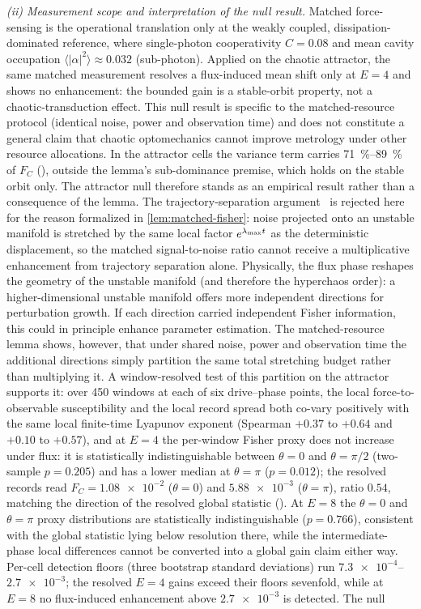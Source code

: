 \documentclass[preprint,numbers,a4paper]{elsarticle}
\begin{document}
\emph{(ii) Measurement scope and interpretation of the null result.} Matched force-sensing is the operational translation only at the weakly coupled, dissipation-dominated reference, where single-photon cooperativity $C=\num{0.08}$ and mean cavity occupation $\langle|\alpha|^2\rangle\approx\num{0.032}$ (sub-photon). Applied on the chaotic attractor, the same matched measurement resolves a flux-induced mean shift only at $E=\num{4}$ and shows no enhancement: the bounded gain is a stable-orbit property, not a chaotic-transduction effect. This null result is specific to the matched-resource protocol (identical noise, power and observation time) and does not constitute a general claim that chaotic optomechanics cannot improve metrology under other resource allocations. In the attractor cells the variance term carries \qty{71}{\percent}--\qty{89}{\percent} of $F_C$ (), outside the lemma's sub-dominance premise, which holds on the stable orbit only. The attractor null therefore stands as an empirical result rather than a consequence of the lemma. The trajectory-separation argument~\cite{Xu2025,muthukumar2025doi} is rejected here for the reason formalized in \cref{lem:matched-fisher}: noise projected onto an unstable manifold is stretched by the same local factor $e^{\lambda_{\rm max}t}$ as the deterministic displacement, so the matched signal-to-noise ratio cannot receive a multiplicative enhancement from trajectory separation alone. Physically, the flux phase reshapes the geometry of the unstable manifold (and therefore the hyperchaos order): a higher-dimensional unstable manifold offers more independent directions for perturbation growth. If each direction carried independent Fisher information, this could in principle enhance parameter estimation. The matched-resource lemma shows, however, that under shared noise, power and observation time the additional directions simply partition the same total stretching budget rather than multiplying it. A window-resolved test of this partition on the attractor supports it: over \num{450} windows at each of six drive--phase points, the local force-to-observable susceptibility and the local record spread both co-vary positively with the same local finite-time Lyapunov exponent (Spearman $+0.37$ to $+0.64$ and $+0.10$ to $+0.57$), and at $E=\num{4}$ the per-window Fisher proxy does not increase under flux: it is statistically indistinguishable between $\theta=0$ and $\theta=\pi/2$ (two-sample $p=\num{0.205}$) and has a lower median at $\theta=\pi$ ($p=\num{0.012}$); the resolved records read $F_C=\num{1.08e-2}$ ($\theta=0$) and $\num{5.88e-3}$ ($\theta=\pi$), ratio $\num{0.54}$, matching the direction of the resolved global statistic (). At $E=\num{8}$ the $\theta=0$ and $\theta=\pi$ proxy distributions are statistically indistinguishable ($p=\num{0.766}$), consistent with the global statistic lying below resolution there, while the intermediate-phase local differences cannot be converted into a global gain claim either way. Per-cell detection floors (three bootstrap standard deviations) run $\num{7.3e-4}$--$\num{2.7e-3}$; the resolved $E=\num{4}$ gains exceed their floors sevenfold, while at $E=\num{8}$ no flux-induced enhancement above $\num{2.7e-3}$ is detected. The null 
\end{document}
